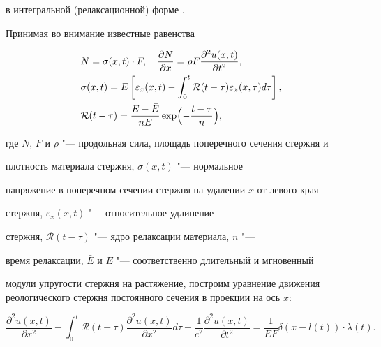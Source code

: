 в интегральной (релаксационной) форме \cite{pavlov:bib2}.



Принимая во внимание известные равенства

\begin{equation}

\label{pavlov:eq3}

\begin{aligned}

& N=\sigma ( x,t )\cdot F, \quad \frac{\partial N}{\partial x}=\rho F\frac{\partial^2 u (x,t)}{\partial t^2},\\

&\sigma (x,t)=E\left[ \varepsilon _x (x,t) - \int_0^t \mathcal{R} (t-\tau) \varepsilon_x (x,\tau) d\tau  \right], \\

&\mathcal{R}(t-\tau)=\frac{E-\bar {E}}{nE}\exp \Bigl({-\frac{t-\tau }{n}}\Bigr),

\end{aligned}

\end{equation}

где $N$, $F$ и $\rho $ "--- продольная сила, площадь поперечного сечения стержня и

плотность материала стержня, $\sigma ( x,t )$ "--- нормальное

напряжение в поперечном сечении стержня на удалении $x$ от левого края

стержня, $\varepsilon _x (x,t)$ "--- относительное удлинение

стержня, $\mathcal{R}(t-\tau)$ "--- ядро релаксации материала, $n$ "---

время релаксации, $\bar {E}$ и $E$ "--- соответственно длительный и мгновенный

модули упругости стержня на растяжение, построим уравнение движения реологического стержня постоянного сечения в проекции на ось $x$:

\begin{equation}

\label{pavlov:eq4}

\frac{\partial ^2u ( x,t )}{\partial x^2}-\int_0^t \mathcal{R}

( t-\tau )\frac{\partial ^2u( x,t )}{\partial x^2}d \tau  -\frac{1}{c^2}\frac{\partial^2 u(x,t)}

{\partial t^2}=\frac{1}{EF}\delta ( x-l( t ))\cdot \lambda ( t ).

\end{equation}

